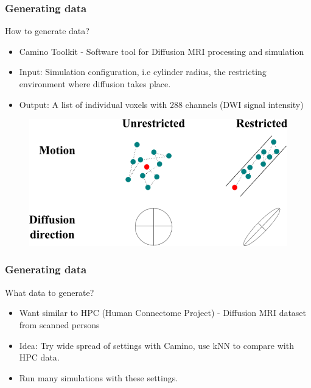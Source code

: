 \documentclass{beamer}
\begin{document}
\begin{frame}
\frametitle{Generating data}
How to generate data?
\begin{itemize}
\item<2->Camino Toolkit - Software tool for Diffusion MRI processing and simulation
\item<3->Input: Simulation configuration, i.e cylinder radius, the restricting environment where diffusion takes place.
\item<4->Output: A list of individual voxels with 288 channels (DWI signal intensity)
\end{itemize}

\pause
\pause
\pause
\pause

\begin{figure}[h]
    \centering
    \includegraphics[scale=0.4]{brownianMotion.png}
    \label{fig:mesh1}
\end{figure}

\end{frame}

\begin{frame}
\frametitle{Generating data}
What data to generate?
\begin{itemize}
\item<2->Want similar to HPC (Human Connectome Project) - Diffusion MRI dataset from scanned persons
\item<3->Idea: Try wide spread of settings with Camino, use kNN to compare with HPC data.
\item<4->Run many simulations with these settings.
\end{itemize}
\end{frame}
\end{document}
